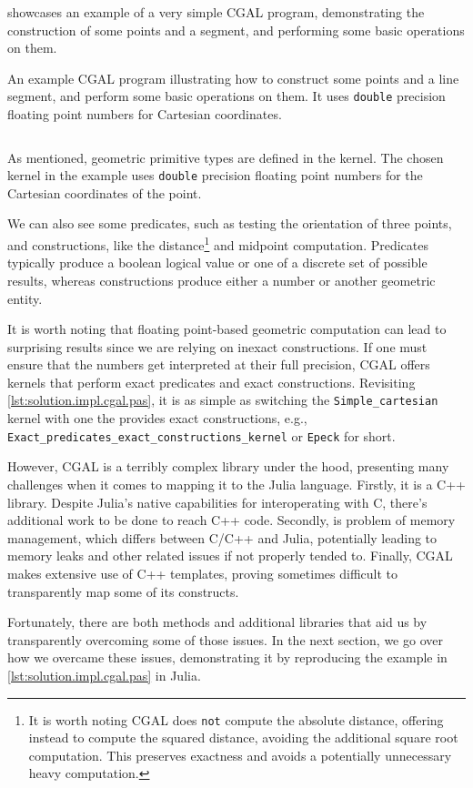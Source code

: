  showcases an example of a very simple
\ac{CGAL} program, demonstrating the construction of some points and a segment,
and performing some basic operations on them.

\begin{listing}[htbp]
  \caption[CGAL: Three points and one segment]{
    An example CGAL program illustrating how to construct some points and a line
    segment, and perform some basic operations on them.  It uses
    \texttt{double} precision floating point numbers for Cartesian
    coordinates.}\label{lst:solution.impl.cgal.pas}
  \inputminted{cpp}{cpp/points_and_segments.cpp}
\end{listing}

As mentioned, geometric primitive types are defined in the kernel.  The chosen
kernel in the example uses \texttt{double} precision floating point numbers for
the Cartesian coordinates of the point.

We can also see some predicates, such as testing the orientation of three
points, and constructions, like the distance\footnote{It is worth noting
\ac{CGAL} does \texttt{not} compute the absolute distance, offering instead to
compute the squared distance, avoiding the additional square root computation.
This preserves exactness and avoids a potentially unnecessary heavy
computation.} and midpoint computation.  Predicates typically produce a boolean
logical value or one of a discrete set of possible results, whereas
constructions produce either a number or another geometric entity.

It is worth noting that floating point-based geometric computation can lead to
surprising results since we are relying on inexact constructions.  If one must
ensure that the numbers get interpreted at their full precision, \ac{CGAL}
offers kernels that perform exact predicates and exact constructions.
Revisiting \cref{lst:solution.impl.cgal.pas}, it is as simple as switching the
\texttt{Simple\_cartesian} kernel with one the provides exact constructions,
e.g., \texttt{Exact\_predicates\_exact\_constructions\_kernel} or \texttt{Epeck}
for short.

However, \ac{CGAL} is a terribly complex library under the hood, presenting many
challenges when it comes to mapping it to the Julia language.  Firstly, it is a
C++ library.  Despite Julia's native capabilities for interoperating with C,
there's additional work to be done to reach C++ code.  Secondly, is problem of
memory management, which differs between C/C++ and Julia, potentially leading to
memory leaks and other related issues if not properly tended to.  Finally,
\ac{CGAL} makes extensive use of C++ templates, proving sometimes difficult to
transparently map some of its constructs.

Fortunately, there are both methods and additional libraries that aid us by
transparently overcoming some of those issues.  In the next section, we go over
how we overcame these issues, demonstrating it by reproducing the example in
\cref{lst:solution.impl.cgal.pas} in Julia.
